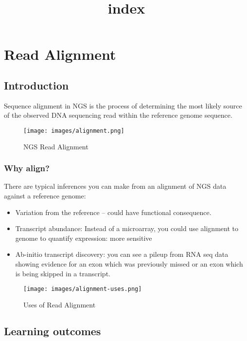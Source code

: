 \documentclass[11pt]{article}
\title{index}
\providecommand{\tightlist}{%
      \setlength{\itemsep}{0pt}\setlength{\parskip}{0pt}}
\begin{document}
    \hypertarget{read-alignment}{%
\section{Read Alignment}\label{read-alignment}}

\hypertarget{introduction}{%
\subsection{Introduction}\label{introduction}}

Sequence alignment in NGS is the process of determining the most likely
source of the observed DNA sequencing read within the reference genome
sequence.

    \begin{figure}
\centering
\texttt{[image: images/alignment.png]}
\caption{NGS Read Alignment}
\end{figure}

    \hypertarget{why-align}{%
\subsubsection{Why align?}\label{why-align}}

There are typical inferences you can make from an alignment of NGS data
against a reference genome:

\begin{itemize}
\tightlist
\item
  Variation from the reference -- could have functional consequence.
\item
  Transcript abundance: Instead of a microarray, you could use alignment
  to genome to quantify expression: more sensitive
\item
  Ab-initio transcript discovery: you can see a pileup from RNA seq data
  showing evidence for an exon which was previously missed or an exon
  which is being skipped in a transcript.
\end{itemize}

    \begin{figure}
\centering
\texttt{[image: images/alignment-uses.png]}
\caption{Uses of Read Alignment}
\end{figure}

    \hypertarget{learning-outcomes}{%
\subsection{Learning outcomes}\label{learning-outcomes}}
\end{document}

